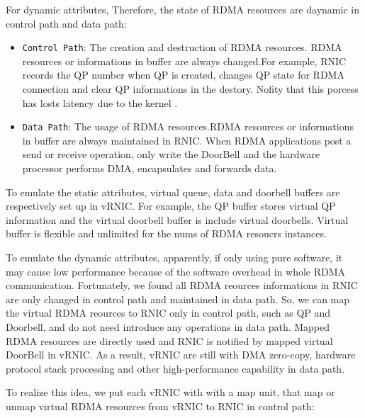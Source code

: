 \documentclass[sigplan,screen]{acmart}
\begin{document}
For dynamic attributes, Therefore, the state of RDMA resources are daynamic in control path and data path:  

\begin{itemize}
\item {\verb|Control Path|}: The creation and destruction of RDMA resources. RDMA resources or informations in buffer are always changed.For example, RNIC records the QP number when QP is created, changes QP state for RDMA connection and clear QP informations in the destory. Nofity that this porcess has losts latency due to the kernel .
\item {\verb|Data Path|}: The usage of RDMA resources.RDMA resources or informations in buffer are always maintained in RNIC. When RDMA applications post a send or receive operation, only write the DoorBell and the hardware processor performs DMA, encapsulates and forwards data.
\end{itemize}

To emulate the static attributes, virtual queue, data and doorbell buffers are respectively set up in vRNIC. For example, the QP buffer stores virtual QP information and the virtual doorbell buffer is include virtual doorbells. Virtual buffer is flexible and unlimited for the nums of RDMA resoucrs instances. 

To emulate the dynamic attributes, apparently, if only using pure software, it may cause low performance because of the software overhead in whole RDMA communication. Fortunately, we found all RDMA reources informations in RNIC are only changed in control path and maintained in data path. So, we can map the virtual RDMA reources to RNIC only in control path, such as QP and Doorbell,  and do not need introduce any operations in data path. Mapped RDMA resources are directly used and RNIC is notified by mapped virtual DoorBell in vRNIC. As a result, vRNIC are still with DMA zero-copy, hardware protocol stack processing and other high-performance capability in data path.

To realize this idea, we put each vRNIC with with a map unit, that map or unmap virtual RDMA resources from vRNIC to RNIC in control path:
\end{document}
